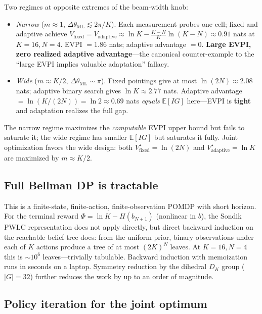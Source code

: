\documentclass[11pt,a4paper]{article}
\newcommand{\E}{\mathbb{E}}
\begin{document}
Two regimes at opposite extremes of the beam-width knob:

\begin{itemize}[nosep, leftmargin=*]
\item \emph{Narrow} ($m \approx 1$, $\Delta\theta_{\mathrm{ML}} \lesssim 2\pi/K$).  Each measurement probes one cell; fixed and adaptive achieve $V_{\mathrm{fixed}} = V_{\mathrm{adaptive}} \approx \ln K - \frac{K-N}{K}\ln(K-N) \approx 0.91$ nats at $K=16, N=4$.  EVPI $= 1.86$ nats; adaptive advantage $= 0$.  \textbf{Large EVPI, zero realized adaptive advantage}---the canonical counter-example to the ``large EVPI implies valuable adaptation'' fallacy.

\item \emph{Wide} ($m \approx K/2$, $\Delta\theta_{\mathrm{ML}} \sim \pi$).  Fixed pointings give at most $\ln(2N) \approx 2.08$ nats; adaptive binary search gives $\ln K \approx 2.77$ nats.  Adaptive advantage $= \ln(K/(2N)) = \ln 2 \approx 0.69$ nats \emph{equals} $\E[IG]$ here---EVPI is \textbf{tight} and adaptation realizes the full gap.
\end{itemize}

The narrow regime maximizes the \emph{computable} EVPI upper bound but fails to saturate it; the wide regime has smaller $\E[IG]$ but saturates it fully.  Joint optimization favors the wide design: both $V_{\mathrm{fixed}}^\star = \ln(2N)$ and $V_{\mathrm{adaptive}}^\star = \ln K$ are maximized by $m \approx K/2$.

\subsection{Full Bellman DP is tractable}

This is a finite-state, finite-action, finite-observation POMDP with short horizon.  For the terminal reward $\Phi = \ln K - H(b_{N+1})$ (nonlinear in $b$), the Sondik PWLC representation does not apply directly, but direct backward induction on the reachable belief tree does: from the uniform prior, binary observations under each of $K$ actions produce a tree of at most $(2K)^N$ leaves.  At $K = 16, N = 4$ this is $\sim 10^6$ leaves---trivially tabulable.  Backward induction with memoization runs in seconds on a laptop.  Symmetry reduction by the dihedral $D_K$ group ($|G| = 32$) further reduces the work by up to an order of magnitude.

\subsection{Policy iteration for the joint optimum}
\end{document}
